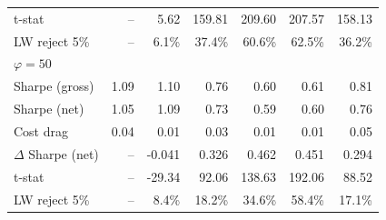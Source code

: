 \begin{tabular*}{\textwidth}{l@{\extracolsep{\fill}}rrrrrr}
t-stat & --\phantom{$^{***}$} & 5.62\phantom{$^{***}$} & 159.81\phantom{$^{***}$} & 209.60\phantom{$^{***}$} & 207.57\phantom{$^{***}$} & 158.13\phantom{$^{***}$} \\
LW reject 5\% & --\phantom{$^{***}$} & 6.1\%\phantom{$^{***}$} & 37.4\%\phantom{$^{***}$} & 60.6\%\phantom{$^{***}$} & 62.5\%\phantom{$^{***}$} & 36.2\%\phantom{$^{***}$} \\
\midrule
\multicolumn{7}{l}{\textit{$\varphi = 50$}} \\
\midrule
Sharpe (gross) & 1.09\phantom{$^{***}$} & 1.10\phantom{$^{***}$} & 0.76\phantom{$^{***}$} & 0.60\phantom{$^{***}$} & 0.61\phantom{$^{***}$} & 0.81\phantom{$^{***}$} \\
Sharpe (net) & 1.05\phantom{$^{***}$} & 1.09\phantom{$^{***}$} & 0.73\phantom{$^{***}$} & 0.59\phantom{$^{***}$} & 0.60\phantom{$^{***}$} & 0.76\phantom{$^{***}$} \\
Cost drag & 0.04\phantom{$^{***}$} & 0.01\phantom{$^{***}$} & 0.03\phantom{$^{***}$} & 0.01\phantom{$^{***}$} & 0.01\phantom{$^{***}$} & 0.05\phantom{$^{***}$} \\
$\Delta$ Sharpe (net) & --\phantom{$^{***}$} & -0.041\rlap{$^{***}$}\phantom{$^{***}$} & 0.326\rlap{$^{***}$}\phantom{$^{***}$} & 0.462\rlap{$^{***}$}\phantom{$^{***}$} & 0.451\rlap{$^{***}$}\phantom{$^{***}$} & 0.294\rlap{$^{***}$}\phantom{$^{***}$} \\
t-stat & --\phantom{$^{***}$} & -29.34\phantom{$^{***}$} & 92.06\phantom{$^{***}$} & 138.63\phantom{$^{***}$} & 192.06\phantom{$^{***}$} & 88.52\phantom{$^{***}$} \\
LW reject 5\% & --\phantom{$^{***}$} & 8.4\%\phantom{$^{***}$} & 18.2\%\phantom{$^{***}$} & 34.6\%\phantom{$^{***}$} & 58.4\%\phantom{$^{***}$} & 17.1\%\phantom{$^{***}$} \\
\bottomrule
\end{tabular*}

